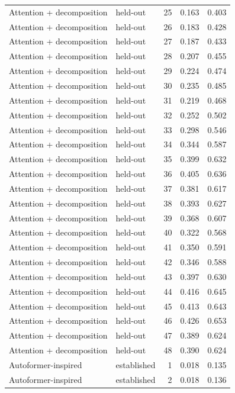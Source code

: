 \begin{tabular}{llrrr}
Attention + decomposition & held-out & 25 & 0.163 & 0.403 \\
Attention + decomposition & held-out & 26 & 0.183 & 0.428 \\
Attention + decomposition & held-out & 27 & 0.187 & 0.433 \\
Attention + decomposition & held-out & 28 & 0.207 & 0.455 \\
Attention + decomposition & held-out & 29 & 0.224 & 0.474 \\
Attention + decomposition & held-out & 30 & 0.235 & 0.485 \\
Attention + decomposition & held-out & 31 & 0.219 & 0.468 \\
Attention + decomposition & held-out & 32 & 0.252 & 0.502 \\
Attention + decomposition & held-out & 33 & 0.298 & 0.546 \\
Attention + decomposition & held-out & 34 & 0.344 & 0.587 \\
Attention + decomposition & held-out & 35 & 0.399 & 0.632 \\
Attention + decomposition & held-out & 36 & 0.405 & 0.636 \\
Attention + decomposition & held-out & 37 & 0.381 & 0.617 \\
Attention + decomposition & held-out & 38 & 0.393 & 0.627 \\
Attention + decomposition & held-out & 39 & 0.368 & 0.607 \\
Attention + decomposition & held-out & 40 & 0.322 & 0.568 \\
Attention + decomposition & held-out & 41 & 0.350 & 0.591 \\
Attention + decomposition & held-out & 42 & 0.346 & 0.588 \\
Attention + decomposition & held-out & 43 & 0.397 & 0.630 \\
Attention + decomposition & held-out & 44 & 0.416 & 0.645 \\
Attention + decomposition & held-out & 45 & 0.413 & 0.643 \\
Attention + decomposition & held-out & 46 & 0.426 & 0.653 \\
Attention + decomposition & held-out & 47 & 0.389 & 0.624 \\
Attention + decomposition & held-out & 48 & 0.390 & 0.624 \\
Autoformer-inspired & established & 1 & 0.018 & 0.135 \\
Autoformer-inspired & established & 2 & 0.018 & 0.136 \\

\end{tabular}
